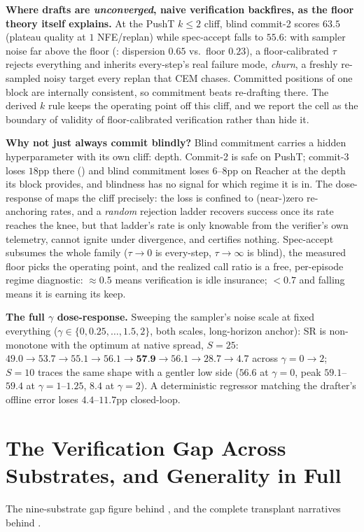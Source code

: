 \documentclass{article}
\newcommand{\ours}[1]{\textbf{#1}}
\begin{document}
\textbf{Where drafts are \emph{unconverged}, naive verification backfires, as the
floor theory itself explains.} At the PushT $k{\leq}2$ cliff, blind commit-2
scores $63.5$ (plateau quality at $1$ NFE/replan) while spec-accept falls to $55.6$:
with sampler noise far above the floor (: dispersion $0.65$ vs.\
floor $0.23$), a floor-calibrated $\tau$ rejects everything and inherits
every-step's real failure mode, \emph{churn}, a freshly re-sampled noisy target
every replan that CEM chases. Committed positions of one block are internally
consistent, so commitment beats re-drafting there. The derived $k$ rule keeps the
operating point off this cliff, and we report the cell as the boundary of validity
of floor-calibrated verification rather than hide it.

\textbf{Why not just always commit blindly?} Blind commitment carries a hidden
hyperparameter with its own cliff: depth. Commit-2 is safe on PushT; commit-3 loses
$18$pp there (\Cref{sec:negatives}) and blind commitment loses $6$--$8$pp on Reacher
at the depth its block provides, and blindness has no signal for which regime it
is in. The dose-response of \Cref{sec:results-cert} maps the cliff precisely: the
loss is confined to (near-)zero re-anchoring rates, and a \emph{random} rejection
ladder recovers success once its rate reaches the knee, but that ladder's rate is
only knowable from the verifier's own telemetry, cannot ignite under divergence,
and certifies nothing. Spec-accept subsumes the whole family ($\tau{\to}0$ is
every-step, $\tau{\to}\infty$ is blind), the measured floor picks the operating
point, and the realized call ratio is a free, per-episode regime diagnostic:
${\approx}0.5$ means verification is idle insurance; ${<}0.7$ and falling means it
is earning its keep.

\textbf{The full $\gamma$ dose-response.} Sweeping the sampler's noise scale at
fixed everything ($\gamma\in\{0,0.25,\ldots,1.5,2\}$, both scales, long-horizon
anchor): SR is non-monotone with the optimum at native spread, $S{=}25$:
$49.0\to53.7\to55.1\to56.1\to\ours{57.9}\to56.1\to28.7\to4.7$ across
$\gamma{=}0\to2$; $S{=}10$ traces the same shape with a gentler low side
($56.6$ at $\gamma{=}0$, peak $59.1$--$59.4$ at $\gamma{=}1$--$1.25$, $8.4$ at
$\gamma{=}2$). A deterministic regressor matching the drafter's offline error
loses $4.4$--$11.7$pp closed-loop.

\section{The Verification Gap Across Substrates, and Generality in Full}
\label{app:generality}
The nine-substrate gap figure behind , and the complete
transplant narratives behind \Cref{sec:generality}.
\end{document}
